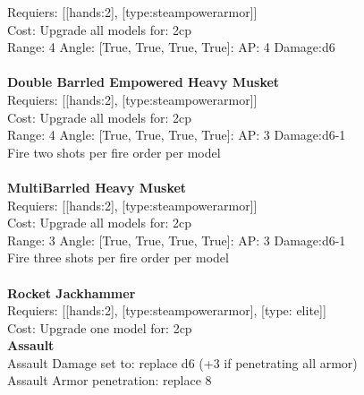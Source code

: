 Requiers: [[hands:2], [type:steampowerarmor]] \\
Cost: Upgrade all models for: 2cp \\


Range: 4  Angle: [True, True, True, True]: AP: 4 Damage:d6 \\








\ \\
{\bf Double Barrled Empowered Heavy Musket } \\

Requiers: [[hands:2], [type:steampowerarmor]] \\
Cost: Upgrade all models for: 2cp \\


Range: 4  Angle: [True, True, True, True]: AP: 3 Damage:d6-1 \\
Fire two shots per fire order per model\\ 








\ \\
{\bf MultiBarrled Heavy Musket } \\

Requiers: [[hands:2], [type:steampowerarmor]] \\
Cost: Upgrade all models for: 2cp \\


Range: 3  Angle: [True, True, True, True]: AP: 3 Damage:d6-1 \\
Fire three shots per fire order per model\\ 








\ \\
{\bf Rocket Jackhammer } \\

Requiers: [[hands:2], [type:steampowerarmor], [type: elite]] \\
Cost: Upgrade one model for: 2cp \\




{\bf Assault} \ \\
Assault Damage set to: replace d6 (+3 if penetrating all armor)
\\ 
Assault Armor penetration: replace 8 
\\ 




